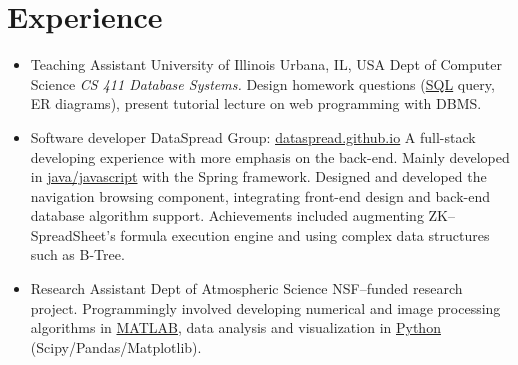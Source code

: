 \documentclass[11pt,a4paper,sans]{moderncv}        %
\begin{document}
\section{Experience}
\begin{itemize}
	
	\item{
	      {Teaching Assistant}
	      {University of Illinois}
	      {Urbana, IL, USA}
	      {Dept of Computer Science}
	      {\emph{CS 411 Database Systems.} Design homework questions (\underline{SQL} query, ER diagrams), present tutorial lecture on web programming with DBMS.}
	      }
	      
	\item{
	      {Software developer}
	      {\vspace{-10pt}}
	      {}
	      {DataSpread Group: \href{https://github.com/dataspread/dataspread-web}{\faGithub} \href{https://dataspread.github.io}{\underline{dataspread.github.io}}}
	      {
		      A full-stack developing experience with more emphasis on the back-end. Mainly developed in \underline{java/javascript} with the Spring framework. Designed and developed the navigation browsing component, integrating front-end design and back-end database algorithm support. Achievements included augmenting ZK--SpreadSheet's formula execution engine and using complex data structures such as B-Tree.}
	      }
	      
	      
	\item{
	      {Research Assistant}
	      {\vspace{-10pt}}
	      {}
	      {Dept of Atmospheric Science}
	      {
		      NSF--funded research project. Programmingly involved developing numerical and image processing algorithms in \underline{MATLAB}, data analysis and visualization in \underline{Python} (Scipy/Pandas/Matplotlib).}
	      }
	      

\end{itemize}
\end{document}
